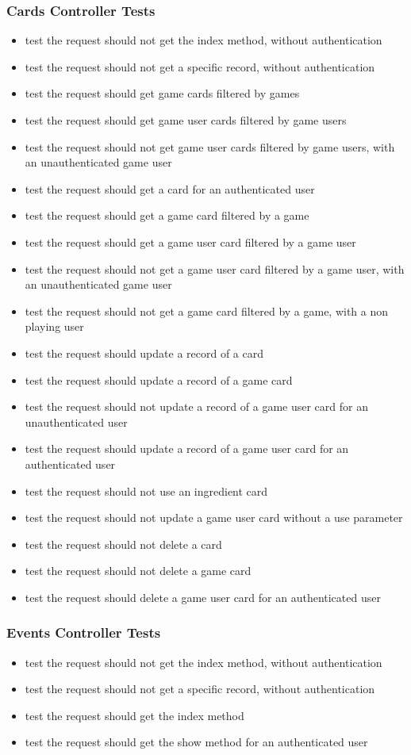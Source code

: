 \subsubsection{Cards Controller Tests}
\begin{itemize}
	\item test the request should not get the index method, without authentication
	\item test the request should not get a specific record, without authentication
	\item test the request should get game cards filtered by games
	\item test the request should get game user cards filtered by game users
	\item test the request should not get game user cards filtered by game users, with an unauthenticated game user
	\item test the request should get  a card for an authenticated user
	\item test the request should get a game card filtered by a game
	\item test the request should get a game user card filtered by a game user
	\item test the request should not get a game user card filtered by a game user, with an unauthenticated game user
	\item test the request should not get a game card filtered by a game, with a non playing user
	\item test the request should update a record of a card
	\item test the request should update a record of a game card
	\item test the request should not update a record of a game user card for an unauthenticated user
	\item test the request should update a record of a game user card for an authenticated user
	\item test the request should not use an ingredient card
	\item test the request should not update a game user card without a use parameter
	\item test the request should not delete a card
	\item test the request should not delete a game card
	\item test the request should delete a game user card for an authenticated user
\end{itemize}

\subsubsection{Events Controller Tests}
\begin{itemize}
	\item test the request should not get the index method, without authentication
	\item test the request should not get a specific record, without authentication
	\item test the request should get the index method
	\item test the request should get the show method for an authenticated user
\end{itemize}

